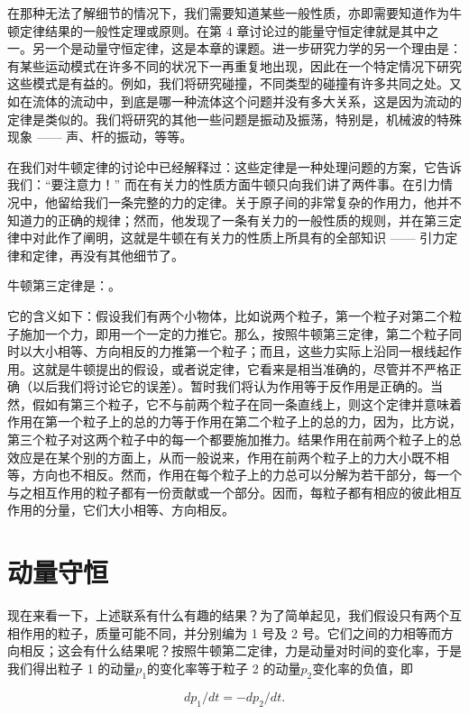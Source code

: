 \documentclass[12pt,oneside]{book}
\begin{document}
在那种无法了解细节的情况下，我们需要知道某些一般性质，亦即需要知道作为牛顿定律结果的一般性定理或原则。在第 4 章讨论过的能量守恒定律就是其中之一。另一个是动量守恒定律，这是本章的课题。进一步研究力学的另一个理由是：有某些运动模式在许多不同的状况下一再重复地出现，因此在一个特定情况下研究这些模式是有益的。例如，我们将研究碰撞，不同类型的碰撞有许多共同之处。又如在流体的流动中，到底是哪一种流体这个问题并没有多大关系，这是因为流动的定律是类似的。我们将研究的其他一些问题是振动及振荡，特别是，机械波的特殊现象 —— 声、杆的振动，等等。

在我们对牛顿定律的讨论中已经解释过：这些定律是一种处理问题的方案，它告诉我们：“要注意力！” 而在有关力的性质方面牛顿只向我们讲了两件事。在引力情况中，他留给我们一条完整的力的定律。关于原子间的非常复杂的作用力，他并不知道力的正确的规律；然而，他发现了一条有关力的一般性质的规则，并在第三定律中对此作了阐明，这就是牛顿在有关力的性质上所具有的全部知识 —— 引力定律和定律，再没有其他细节了。

牛顿第三定律是：。

它的含义如下：假设我们有两个小物体，比如说两个粒子，第一个粒子对第二个粒子施加一个力，即用一个一定的力推它。那么，按照牛顿第三定律，第二个粒子同时以大小相等、方向相反的力推第一个粒子；而且，这些力实际上沿同一根线起作用。这就是牛顿提出的假设，或者说定律，它看来是相当准确的，尽管并不严格正确（以后我们将讨论它的误差）。暂时我们将认为作用等于反作用是正确的。当然，假如有第三个粒子，它不与前两个粒子在同一条直线上，则这个定律并意味着作用在第一个粒子上的总的力等于作用在第二个粒子上的总的力，因为，比方说，第三个粒子对这两个粒子中的每一个都要施加推力。结果作用在前两个粒子上的总效应是在某个别的方面上，从而一般说来，作用在前两个粒子上的力大小既不相等，方向也不相反。然而，作用在每个粒子上的力总可以分解为若干部分，每一个与之相互作用的粒子都有一份贡献或一个部分。因而，每粒子都有相应的彼此相互作用的分量，它们大小相等、方向相反。


\section{动量守恒}
现在来看一下，上述联系有什么有趣的结果？为了简单起见，我们假设只有两个互相作用的粒子，质量可能不同，并分别编为 1 号及 2 号。它们之间的力相等而方向相反；这会有什么结果呢？按照牛顿第二定律，力是动量对时间的变化率，于是我们得出粒子 1 的动量$p_1$的变化率等于粒子 2 的动量$p_2$变化率的负值，即

\begin{equation}
\label{Eq:I:10:1}
dp_1/dt=-dp_2/dt.
\end{equation}
\end{document}
